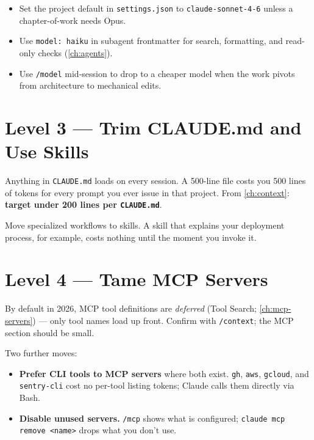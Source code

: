 \begin{itemize}
  \item Set the project default in \texttt{settings.json} to
        \texttt{claude-sonnet-4-6} unless a chapter-of-work needs Opus.
  \item Use \texttt{model: haiku} in subagent frontmatter for search,
        formatting, and read-only checks (\cref{ch:agents}).
  \item Use \texttt{/model} mid-session to drop to a cheaper model when
        the work pivots from architecture to mechanical edits.
\end{itemize}

\section{Level 3 — Trim CLAUDE.md and Use Skills}
\label{sec:cost-claude-md}


Anything in \texttt{CLAUDE.md} loads on every session. A 500-line file
costs you 500 lines of tokens for every prompt you ever issue in that
project. From \cref{ch:context}: \textbf{target under 200 lines per
\texttt{CLAUDE.md}}.

Move specialized workflows to skills. A skill that explains your
deployment process, for example, costs nothing until the moment you
invoke it.

\section{Level 4 — Tame MCP Servers}
\label{sec:cost-mcp}


By default in 2026, MCP tool definitions are \emph{deferred} (Tool Search;
\cref{ch:mcp-servers}) — only tool names load up front. Confirm with
\texttt{/context}; the MCP section should be small.

Two further moves:

\begin{itemize}
  \item \textbf{Prefer CLI tools to MCP servers} where both exist.
        \texttt{gh}, \texttt{aws}, \texttt{gcloud}, and \texttt{sentry-cli}
        cost no per-tool listing tokens; Claude calls them directly via
        Bash.
  \item \textbf{Disable unused servers.} \texttt{/mcp} shows what is
        configured; \texttt{claude mcp remove <name>} drops what you
        don't use.
\end{itemize}

